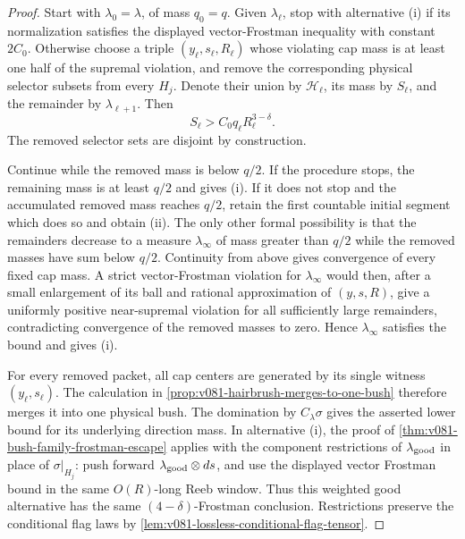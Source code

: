 \documentclass[10pt]{article}
\begin{document}
\begin{proof}
Start with \(\lambda_0=\lambda\), of mass \(q_0=q\).  Given
\(\lambda_\ell\), stop with alternative \textnormal{(i)} if its normalization satisfies the
displayed vector-Frostman inequality with constant \(2C_0\).  Otherwise choose a triple
\((y_\ell,s_\ell,R_\ell)\) whose violating cap mass is at least one half of the supremal violation,
and remove the corresponding physical selector subsets from every \(H_j\).  Denote their union by
\(\mathcal H_\ell\), its mass by \(S_\ell\), and the remainder by
\(\lambda_{\ell+1}\).  Then
\[
S_\ell>C_0q_\ell R_\ell^{3-\delta}.
\]
The removed selector sets are disjoint by construction.

Continue while the removed mass is below \(q/2\).  If the procedure stops, the remaining mass is
at least \(q/2\) and gives \textnormal{(i)}.  If it does not stop and the accumulated removed mass
reaches \(q/2\), retain the first countable initial segment which does so and obtain
\textnormal{(ii)}.  The only other formal possibility is that the remainders decrease to a measure
\(\lambda_\infty\) of mass greater than \(q/2\) while the removed masses have sum below \(q/2\).
Continuity from above gives convergence of every fixed cap mass.  A strict vector-Frostman
violation for \(\lambda_\infty\) would then, after a small enlargement of its ball and rational
approximation of \((y,s,R)\), give a uniformly positive near-supremal violation for all sufficiently
large remainders, contradicting convergence of the removed masses to zero.  Hence
\(\lambda_\infty\) satisfies the bound and gives \textnormal{(i)}.

For every removed packet, all cap centers are generated by its single witness
\((y_\ell,s_\ell)\).  The calculation in
\cref{prop:v081-hairbrush-merges-to-one-bush} therefore merges it into one physical bush.
The domination by \(C_\lambda\sigma\) gives the asserted lower bound for its underlying direction
mass.  In alternative \textnormal{(i)}, the proof of
\cref{thm:v081-bush-family-frostman-escape} applies with the component restrictions of
\(\lambda_{\rm good}\) in place of \(\sigma|_{H_j}\): push forward
\(\lambda_{\rm good}\otimes ds\), and use the displayed vector Frostman bound in the same
\(O(R)\)-long Reeb window.  Thus this weighted good alternative has the same
\((4-\delta)\)-Frostman conclusion.
Restrictions preserve the conditional flag laws by
\cref{lem:v081-lossless-conditional-flag-tensor}.
\end{proof}
\end{document}
